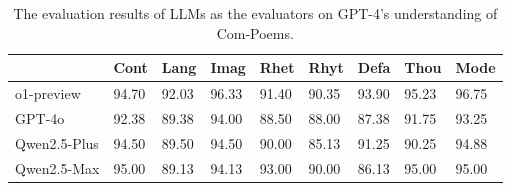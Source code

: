 \documentclass[11pt]{article}
\begin{document}



\begin{table}
  \centering
  \begin{tabular}{lllllllll}
    \hline
   & Cont         & Lang   & Imag & Rhet
 & Rhyt & Defa  & Thou & Mode \\
    \hline
   
   o1-preview &  94.70	& 92.03	& 96.33	& 91.40	& 90.35	& 93.90	& 95.23	& 96.75 \\
       
   GPT-4o & 92.38	& 89.38	& 94.00	& 88.50	& 88.00	& 87.38	& 91.75	& 93.25 \\
    

   
   Qwen2.5-Plus &  94.50	& 89.50	& 94.50	& 90.00	& 85.13	& 91.25	& 90.25	& 94.88  \\
   
   Qwen2.5-Max & 95.00	& 89.13	& 94.13	& 93.00	& 90.00	& 86.13	& 95.00	& 95.00  \\
   

    

    \hline
  \end{tabular}
  \caption{\label{Evaluation results for GPT-4's understanding of Com-Poems by LLMs}
    The evaluation results of LLMs as the evaluators on GPT-4's understanding of Com-Poems.
  }
\end{table}
\end{document}
